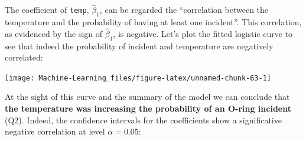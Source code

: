 \documentclass[]{book}
\newenvironment{Shaded}{\begin{snugshade}}{\end{snugshade}}
\newcommand{\KeywordTok}[1]{\textcolor[rgb]{0.13,0.29,0.53}{\textbf{#1}}}
\newcommand{\DataTypeTok}[1]{\textcolor[rgb]{0.13,0.29,0.53}{#1}}
\newcommand{\DecValTok}[1]{\textcolor[rgb]{0.00,0.00,0.81}{#1}}
\newcommand{\FloatTok}[1]{\textcolor[rgb]{0.00,0.00,0.81}{#1}}
\newcommand{\StringTok}[1]{\textcolor[rgb]{0.31,0.60,0.02}{#1}}
\newcommand{\CommentTok}[1]{\textcolor[rgb]{0.56,0.35,0.01}{\textit{#1}}}
\newcommand{\OperatorTok}[1]{\textcolor[rgb]{0.81,0.36,0.00}{\textbf{#1}}}
\newcommand{\NormalTok}[1]{#1}
\theoremstyle{definition}
\theoremstyle{definition}
\theoremstyle{definition}
\theoremstyle{remark}
\begin{document}
The coefficient of \texttt{temp}, \(\hat\beta_1\), can be regarded the
``correlation between the temperature and the probability of having at
least one incident''. This correlation, as evidenced by the sign of
\(\hat\beta_1\), is negative. Let's plot the fitted logistic curve to
see that indeed the probability of incident and temperature are
negatively correlated:

\begin{Shaded}
\end{Shaded}

\begin{center}\texttt{[image: Machine-Learning\_files/figure-latex/unnamed-chunk-63-1]} \end{center}

At the sight of this curve and the summary of the model we can conclude
that \textbf{the temperature was increasing the probability of an O-ring
incident} (Q2). Indeed, the confidence intervals for the coefficients
show a significative negative correlation at level \(\alpha=0.05\):
\end{document}
